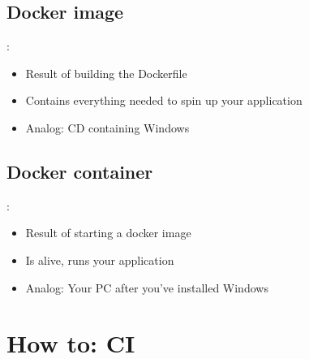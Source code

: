 \documentclass{beamer}
\begin{document}
\subsection{Docker image}
\begin{frame}{\secname : \subsecname}


\begin{itemize}
    \item Result of building the Dockerfile
    \item Contains everything needed to spin up your application
    \item Analog: CD containing Windows
\end{itemize}

\end{frame}

\subsection{Docker container}
\begin{frame}{\secname : \subsecname}


\begin{itemize}
    \item Result of starting a docker image
    \item Is alive, runs your application
    \item Analog: Your PC after you've installed Windows
\end{itemize}

\end{frame}


\section{How to: CI}
\end{document}
